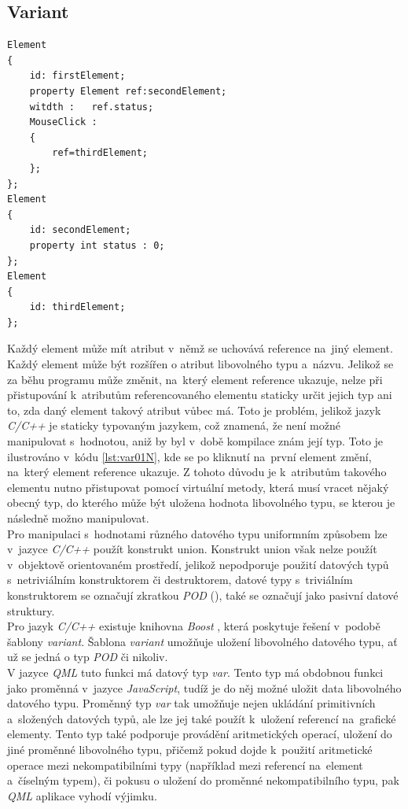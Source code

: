 \documentclass[11pt,twoside,a4paper]{book}
\begin{document}
\subsection {Variant}
\begin{lstlisting}[float,frame=single,caption=Ukázka \textit{CQML} kódu ilustrující nemožnost staticky určit existenci specifického atributu.,label=lst:var01N]
Element
{
	id: firstElement;
	property Element ref:secondElement;
	witdth :   ref.status;
	MouseClick :
	{
		ref=thirdElement;
	};
};
Element
{
	id: secondElement;
	property int status : 0;
};
Element
{
	id: thirdElement;
};
\end{lstlisting}
Každý element může mít atribut v~němž se uchovává reference na~jiný element. Každý element může být rozšířen o atribut libovolného typu a~názvu. Jelikož se za běhu programu může změnit, na~který element reference ukazuje, nelze při přistupování k~atributům referencovaného elementu staticky určit jejich typ ani to, zda daný element takový atribut vůbec má. Toto je problém, jelikož jazyk \textit{C/C++} je staticky typovaným jazykem, což znamená, že není možné manipulovat s~hodnotou, aniž by byl v~době kompilace znám její typ. Toto je ilustrováno v~kódu \ref{lst:var01N}, kde se po kliknutí na~první element změní, na~který element reference ukazuje. Z tohoto důvodu je k~atributům takového elementu nutno přistupovat pomocí virtuální metody, která musí vracet nějaký obecný typ, do kterého může být uložena hodnota libovolného typu, se kterou je následně možno manipulovat.\\
Pro manipulaci s~hodnotami různého datového typu uniformním způsobem lze v~jazyce \textit{C/C++} použít konstrukt union. Konstrukt union však nelze použít v~objektově orientovaném prostředí, jelikož nepodporuje použití datových typů s~netriviálním konstruktorem či destruktorem, datové typy s~triviálním konstruktorem se označují zkratkou \textit{POD} (), také se označují jako pasivní datové struktury.\\
Pro jazyk \textit{C/C++} existuje knihovna \textit{Boost} \cite{bib:boost}, která poskytuje řešení v~podobě šablony \textit{variant}. Šablona \textit{variant} umožňuje uložení libovolného datového typu, ať už se jedná o typ \textit{POD} či nikoliv.\\
V jazyce \textit{QML} tuto funkci má datový typ \textit{var}. Tento typ má obdobnou funkci jako proměnná v~jazyce \textit{JavaScript}, tudíž je do něj možné uložit data libovolného datového typu. Proměnný typ \textit{var} tak umožňuje nejen ukládání primitivních a~složených datových typů, ale lze jej také použít k~uložení referencí na~grafické elementy. Tento typ také podporuje provádění aritmetických operací, uložení do jiné proměnné libovolného typu, přičemž pokud dojde k~použití aritmetické operace mezi nekompatibilními typy (například mezi referencí na~element a~číselným typem), či pokusu o uložení do proměnné nekompatibilního typu, pak \textit{QML} aplikace vyhodí výjimku.\\
\end{document}
